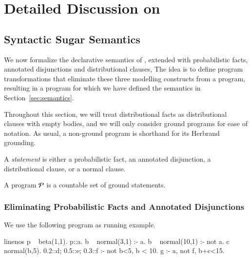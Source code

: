 \section{Detailed Discussion on \dcproblogsty}
\label{sec:detaileddcproblog}




\subsection{Syntactic Sugar Semantics}
\label{sec:semantics_syntactic_sugar}

We now formalize the declarative semantics of \dcproblogsty, \ie \dfplpsty extended with probabilistic facts, annotated disjunctions and distributional clauses,
The idea is to define program transformations that eliminate these three modelling constructs from a \dcproblogsty program, resulting in a \dfplpsty program for which we have defined the semantics in Section~\ref{sec:semantics}.

Throughout this section, we will treat distributional facts as distributional clauses with empty bodies, and we will only consider ground programs for ease of notation. As usual, a non-ground program is shorthand for its Herbrand grounding.


\begin{definition}[Statement]
    A \emph{\dcproblogsty statement} is either a probabilistic fact, an annotated disjunction, a distributional clause, or a normal clause.
\end{definition}

\begin{definition} \label{def:fullprog}
    A \dcproblogsty program ${\mathcal{P}}$ is a countable set of ground \dcproblogsty statements.
\end{definition}






\subsubsection{Eliminating Probabilistic Facts and Annotated Disjunctions}




\begin{example}\label{ex:running-sugar-full}
	We use the following \dcproblogsty program as running example.
	\begin{problog*}{linenos}
p ~ beta(1,1).
p::a.
b ~ normal(3,1) :- a.
b ~ normal(10,1) :- not a.
c ~ normal(b,5).
0.2::d; 0.5::e; 0.3::f :- not b<5, b < 10.
g :- a, not f, b+c<15.
	\end{problog*}
\end{example}



